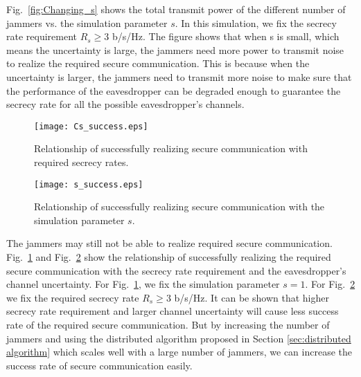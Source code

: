 \documentclass[conference]{IEEEtran}
\begin{document}
Fig.~\ref{fig:Changing_s} shows the total transmit power of the different number of jammers vs. the simulation parameter $s$. In this simulation, we fix the secrecy rate requirement $R_s \geq 3 $ b/s/Hz. The figure shows that when s is small, which means the uncertainty is large, the jammers need more power to transmit noise to realize the required secure communication. This is because when the uncertainty is larger, the jammers need to transmit more noise to make sure that the performance of the eavesdropper can be degraded enough to guarantee the secrecy rate for all the possible eavesdropper's channels.

\begin{figure}[!ht]
	\centering
	\texttt{[image: Cs\_success.eps]} %
	\caption{Relationship of successfully realizing secure communication with required secrecy rates.}
	\label{fig:Cs_success}
\end{figure}
\begin{figure}[!ht]
	\centering
	\texttt{[image: s\_success.eps]} %
	\caption{Relationship of successfully realizing secure communication with the simulation parameter $s$.}
	\label{fig:s_success}
\end{figure}

The jammers may still not be able to realize required secure communication. Fig.~\ref{fig:Cs_success} and Fig.~\ref{fig:s_success} show the relationship of successfully realizing the required secure communication with the secrecy rate requirement and the eavesdropper's channel uncertainty. For Fig.~\ref{fig:Cs_success}, we fix the simulation parameter $s = 1$. For Fig.~\ref{fig:s_success} we fix the required secrecy rate $R_s \geq 3$ b/s/Hz. It can be shown that higher secrecy rate requirement and larger channel uncertainty will cause less success rate of the required secure communication. But by increasing the number of jammers and using the distributed algorithm proposed in Section \ref{sec:distributed algorithm} which scales well with a large number of jammers, we can increase the success rate of secure communication easily. 

%
%
\end{document}
